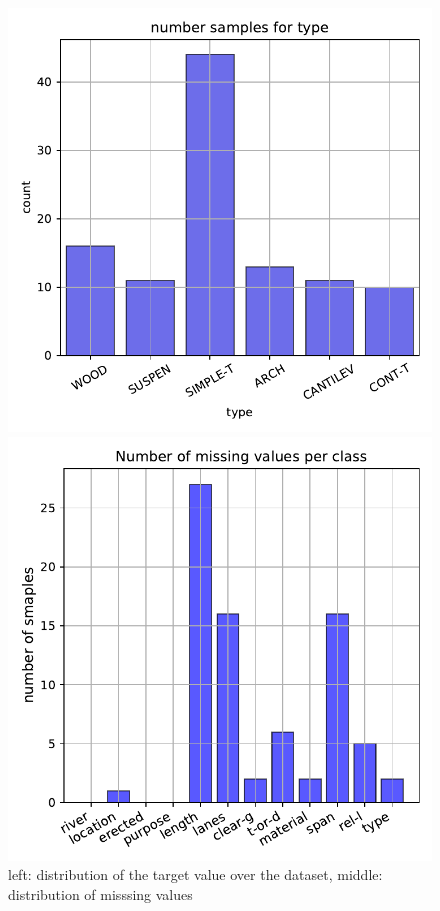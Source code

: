 \documentclass[11pt]{article}
\begin{document}
\begin{figure}
\begin{minipage}[l]{0.3\textwidth}
\includegraphics[width=1\linewidth]{bridges/classification_trainset.pdf}
\end{minipage}
\begin{minipage}[l]{0.3\textwidth}
\includegraphics[width=1\linewidth]{bridges/bridges_missing.pdf}
\end{minipage}
\begin{minipage}[l]{0.3\textwidth}
\end{minipage}
   \caption{left: distribution of the target value over the dataset, middle: distribution of misssing values}
\label{bridges_fig0}
\end{figure}
\end{document}
